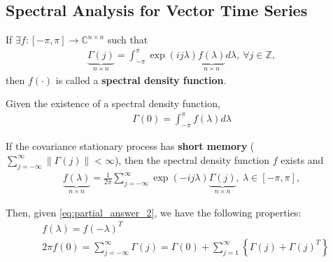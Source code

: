 \documentclass[11pt]{elegantbook}
\begin{document}
\subsection{Spectral Analysis for Vector Time Series}
\begin{definition}
    If $\exists f:[-\pi, \pi] \rightarrow \mathbb{C}^{n\times n}$ such that
    \begin{equation}
        \begin{aligned}
            \underbrace{\Gamma(j)}_{n\times n}=\int_{-\pi}^\pi \exp\left(ij\lambda\right)\underbrace{f(\lambda)}_{n\times n}d \lambda,\ \forall j\in \mathbb{Z},
        \end{aligned}
        \nonumber
    \end{equation}
    then $f(\cdot)$ is called a \textbf{spectral density function}.
\end{definition}
Given the existence of a spectral density function,
\begin{equation}
    \begin{aligned}
        \Gamma(0)=\int_{-\pi}^\pi f(\lambda)d\lambda
    \end{aligned}
    \nonumber
\end{equation}

\begin{lemma}
    If the covariance stationary process has \textbf{short memory} ($\sum_{j=-\infty}^\infty \|\Gamma(j)\|<\infty$), then the spectral density function $f$ exists and
    \begin{equation}
        \begin{aligned}
            \underbrace{f(\lambda)}_{n\times n}=\frac{1}{2\pi}\sum_{j=-\infty}^\infty \exp\left(-ij\lambda\right)\underbrace{\Gamma(j)}_{n\times n},\ \lambda\in[-\pi, \pi],
        \end{aligned}
        \label{eq:partial_answer_2}
    \end{equation}
\end{lemma}
Then, given \eqref{eq:partial_answer_2}, we have the following properties:
\begin{equation}
    \begin{aligned}
        &f(\lambda) = f(-\lambda)^T\\
        &2\pi f(0) = \sum_{j=-\infty}^\infty \Gamma(j) = \Gamma(0) + \sum_{j=1}^\infty \left\{\Gamma(j)+\Gamma(j)^T\right\}
    \end{aligned}
    \nonumber
\end{equation}
\end{document}
